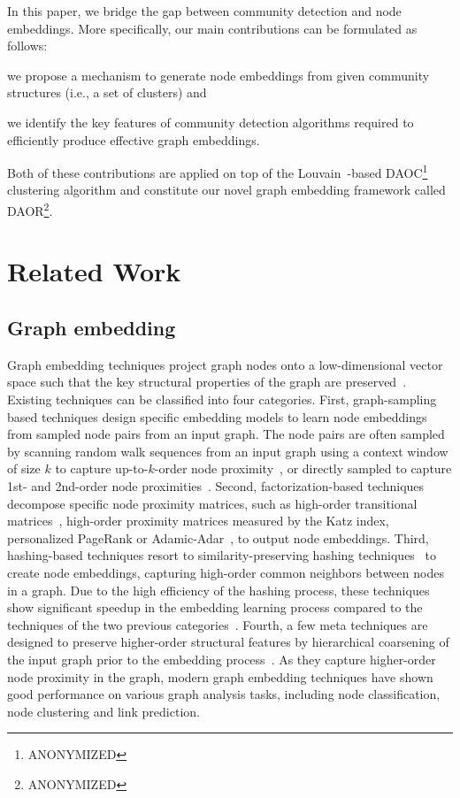 \documentclass[conference]{IEEEtran}
\newcommand{\anm}{ANONYMIZED\xspace}
\newcommand{\urlSys}{\anm} \newcommand{\urlDaoc}{\anm} \newcommand{\urlGembev}{\anm}  \newcommand{\xms}{ANONYM_APP\xspace}  \newcommand{\urlXms}{\anm} \newcommand{\urlBmark}{\anm}  \newcommand{\urlLfr}{\anm} \newcommand{\citeStx}{\anm} \else
\newcommand{\urlSys}{https://github.com/eXascaleInfolab/daor}
\newcommand{\urlDaoc}{https://github.com/eXascaleInfolab/daoc}
\newcommand{\urlGembev}{\url{https://github.com/eXascaleInfolab/GraphEmbEval}\xspace}  \newcommand{\xms}{xmeasures\xspace}  \newcommand{\urlXms}{\url{https://github.com/eXascaleInfolab/xmeasures}\xspace}
\newcommand{\urlBmark}{\url{https://github.com/eXascaleInfolab/clubmark}\xspace}  \newcommand{\urlLfr}{\url{https://github.com/eXascaleInfolab/LFR-Benchmark_UndirWeightOvp}}
\newcommand{\citeStx}{StaTIX~\cite{Stx18}} \fi
\newcommand{\sys}{DAOR\xspace}
\begin{document}
In this paper, we bridge the gap between community detection and node embeddings. More specifically, our main contributions can be formulated as follows:
\begin{inparaenum}
\item we propose a mechanism to generate node embeddings from given community structures (i.e., a set of clusters) and \item we identify the key features of community detection algorithms required to efficiently produce effective graph embeddings.
\end{inparaenum}
Both of these contributions are applied on top of the Louvain~\cite{Bld08}-based DAOC\footnote{\urlDaoc\label{ftn:daoc}}~\cite{Daoc19} clustering algorithm
and constitute  our novel graph embedding framework called \sys\footnote{\urlSys\label{ftn:sys}}.




\section{Related Work}
\label{sec:relwork}

\subsection{Graph embedding}

Graph embedding techniques project graph nodes onto a low-dimensional vector space such that the key structural properties of the graph are preserved~\cite{cai2018comprehensive}. Existing techniques can be classified into four categories.
First, graph-sampling based techniques design specific embedding models to learn node embeddings from sampled node pairs from an input graph. The node pairs are often sampled by scanning random walk sequences from an input graph using a context window of size $k$ to capture up-to-$k$-order node proximity~\cite{Dpwk14,yang2019revisiting,hussein2018meta}, or directly sampled to capture 1st- and 2nd-order node proximities~\cite{tang2015line}.
Second, factorization-based techniques decompose specific node proximity matrices, such as high-order transitional matrices~\cite{cao2015grarep}, high-order proximity matrices measured by the Katz index, personalized PageRank or Adamic-Adar~\cite{Ou16}, to output node embeddings.
Third, hashing-based techniques resort to similarity-preserving hashing techniques~\cite{wu2018efficient,yang2019nodesketch} to create node embeddings, capturing high-order common neighbors between nodes in a graph. Due to the high efficiency of the hashing process, these techniques show significant speedup in the embedding learning process compared to the techniques of the two previous categories~\cite{yang2019nodesketch}.
Fourth, a few meta techniques are designed to preserve higher-order structural features by hierarchical coarsening of the input graph prior to the embedding process~\cite{Harp18}. As they capture higher-order node proximity in the graph, modern graph embedding techniques have shown good performance on various graph analysis tasks, including node classification, node clustering and link prediction.
\end{document}
